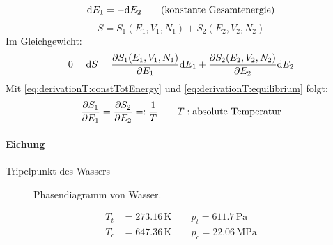 \begin{equation}
    \label{eq:derivationT:constTotEnergy}
    \mathrm{d} E_1 = - \mathrm{d} E_2 \qquad \text{(konstante Gesamtenergie)}
\end{equation}
\begin{equation}
    S = S_1(E_1, V_1, N_1) + S_2 (E_2, V_2, N_2)
\end{equation}
Im Gleichgewicht:
\begin{equation}
    \label{eq:derivationT:equilibrium}
    0 = \mathrm{d} S = \frac{\partial S_1(E_1, V_1, N_1)}{\partial E_1} \mathrm{d} E_1 + \frac{\partial S_2 (E_2, V_2, N_2)}{\partial E_2} \mathrm{d} E_2
\end{equation}
Mit \autoref{eq:derivationT:constTotEnergy} und \autoref{eq:derivationT:equilibrium} folgt:
\begin{equation}
    \frac{\partial S_1}{\partial E_1} = \frac{\partial S_2}{\partial E_2} =: \frac{1}{T} \qquad T:\text{absolute Temperatur}
\end{equation}

\paragraph{Eichung} Tripelpunkt des Wassers

  \begin{figure}[H]
        \centering
        \def\svgwidth{0.5\textwidth}
        
        \caption{Phasendiagramm von Wasser.}
        \label{img:tripelpoint}
    \end{figure}

\begin{equation}
    \begin{split}
        T_t &= 273.16 \, \text{K} \qquad p_t = 611.7 \, \text{Pa} \\
        T_c &= 647.36 \, \text{K} \qquad p_c = 22.06 \, \text{MPa}
    \end{split}
\end{equation}

